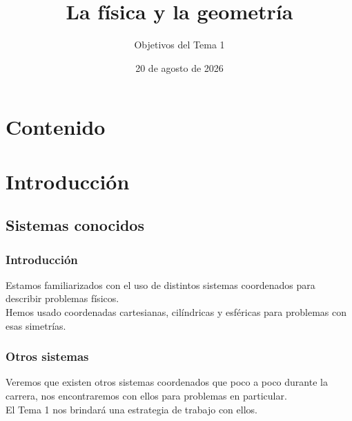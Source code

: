 \documentclass[12pt]{beamer}
\date{20 de agosto de 2026}
\title{La física y la geometría}
\subtitle{Objetivos del Tema 1}
\begin{document}
\maketitle
\fontsize{14}{14}\selectfont
{}

\section*{Contenido}

\section{Introducción}
\subsection{Sistemas conocidos}

\begin{frame}
\frametitle{Introducción}
Estamos familiarizados con el uso de distintos sistemas coordenados para describir problemas físicos.
\\
\bigskip
\pause
Hemos usado coordenadas cartesianas, cilíndricas y esféricas para problemas con esas simetrías.
\end{frame}
\begin{frame}
\frametitle{Otros sistemas}
Veremos que existen otros sistemas coordenados que poco a poco durante la carrera, nos encontraremos con ellos para problemas en particular.
\\
\bigskip
\pause
El Tema 1 nos brindará una estrategia de trabajo con ellos.
\end{frame}

\end{document}
